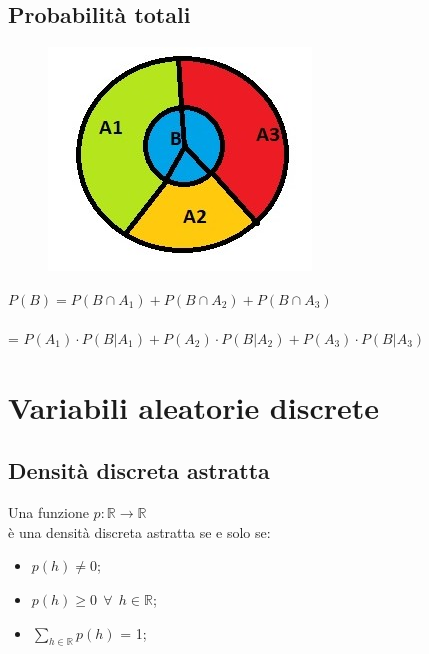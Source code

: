 \subsection{Probabilità totali}
\begin{figure}[H]
	\centering{}
	\includegraphics[width=\textwidth]{img/probtotali}
	\label{img:probtotali}
\end{figure}
	$P(B) = P(B \cap A_1) + P(B \cap A_2) + P(B \cap A_3)$ \\ \\
	= $P(A_1) \cdot P(B|A_1) + P(A_2) \cdot P(B|A_2) + P(A_3) \cdot P(B|A_3)$
\newpage
\section{Variabili aleatorie discrete}
\subsection{Densità discreta astratta}
Una funzione $p : \mathbb{R} \rightarrow \mathbb{R}$ \\
è una densità discreta astratta se e solo se: \\
\begin{itemize}
	\item $p(h) \neq 0$;
	\item $p(h) \geqslant 0 \ \ \forall \ \ h \in \mathbb{R}$;
	\item $\displaystyle \sum_{h \in \mathbb{R}} p(h) $ = 1;
\end{itemize}


